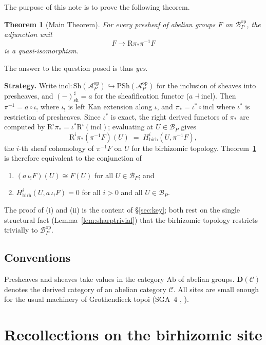 \documentclass[11pt]{article}
\newtheorem{theorem}{Theorem}[section]
\theoremstyle{definition}
\theoremstyle{remark}
\newcommand{\Sh}{\mathrm{Sh}}
\newcommand{\PSh}{\mathrm{PSh}}
\newcommand{\Ab}{\mathrm{Ab}}
\newcommand{\Acal}{\mathcal{A}}
\newcommand{\Bcal}{\mathcal{B}}
\newcommand{\op}{\mathrm{op}}
\begin{document}
The purpose of this note is to prove the following theorem.

\begin{theorem}[Main Theorem]\label{thm:main}
For every presheaf of abelian groups $F$ on $\Bcal_P^{\op}$, the adjunction
unit
\[
   F \longrightarrow \mathrm{R}\pi_* \pi^{-1} F
\]
is a quasi-isomorphism.
\end{theorem}

The answer to the question posed is thus \emph{yes}.

\medskip

\noindent\textbf{Strategy.}  Write
$\mathrm{incl} : \Sh(\Acal_P^{\op}) \hookrightarrow \PSh(\Acal_P^{\op})$ for the
inclusion of sheaves into presheaves, and
$(-)^{\sharp}_{\mathrm{sh}} = a$ for the sheafification functor
($a \dashv \mathrm{incl}$).  Then $\pi^{-1} = a \circ \iota_!$ where $\iota_!$
is left Kan extension along $\iota$, and $\pi_* = \iota^* \circ \mathrm{incl}$
where $\iota^*$ is restriction of presheaves.  Since $\iota^*$ is exact, the
right derived functors of $\pi_*$ are computed by
$\mathrm{R}^i \pi_* = \iota^* \mathrm{R}^i(\mathrm{incl})$; evaluating at
$U \in \Bcal_P$ gives
\[
   \mathrm{R}^i \pi_* (\pi^{-1}F)(U) \;=\; H^i_{\mathrm{birh}}(U, \pi^{-1}F),
\]
the $i$-th sheaf cohomology of $\pi^{-1}F$ on $U$ for the birhizomic topology.
Theorem~\ref{thm:main} is therefore equivalent to the conjunction of
\begin{enumerate}[label=(\roman*)]
 \item $(a\,\iota_! F)(U) \cong F(U)$ for all $U \in \Bcal_P$; and
 \item $H^i_{\mathrm{birh}}(U, a\,\iota_! F) = 0$ for all $i > 0$ and all
       $U \in \Bcal_P$.
\end{enumerate}
The proof of (i) and (ii) is the content of \S\ref{sec:key}; both rest on the
single structural fact (Lemma~\ref{lem:sharptrivial}) that the birhizomic
topology restricts trivially to $\Bcal_P^{\op}$.

\subsection{Conventions}

Presheaves and sheaves take values in the category $\Ab$ of abelian groups.
$\mathbf{D}(\mathcal{C})$ denotes the derived category of an abelian category
$\mathcal{C}$.  All sites are small enough for the usual machinery of
Grothendieck topoi (SGA~4 \cite{SGA4}, \cite{MM92}).

\section{Recollections on the birhizomic site}\label{sec:recoll}
\end{document}
